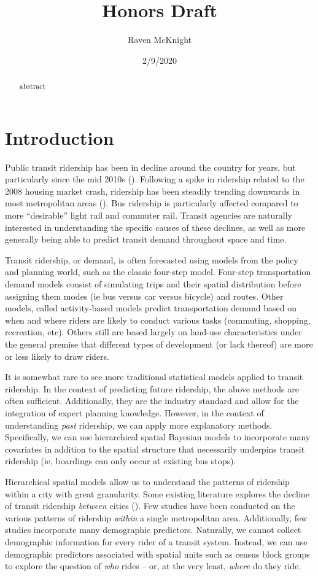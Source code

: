 \documentclass[]{article}
\title{Honors Draft}
\author{Raven McKnight}
\date{2/9/2020}
\begin{document}
\maketitle
\begin{abstract}
abstract
\end{abstract}

\section{Introduction}\label{introduction}

Public transit ridership has been in decline around the country for
years, but particularly since the mid 2010s (). Following a spike in
ridership related to the 2008 housing market crash, ridership has been
steadily trending downwards in most metropolitan areas (). Bus ridership
is particularly affected compared to more ``desirable'' light rail and
commuter rail. Transit agencies are naturally interested in
understanding the specific causes of these declines, as well as more
generally being able to predict transit demand throughout space and
time.

Transit ridership, or demand, is often forecasted using models from the
policy and planning world, such as the classic four-step model.
Four-step transportation demand models consist of simulating trips and
their spatial distribution before assigning them modes (ie bus versus
car versus bicycle) and routes. Other models, called activity-based
models predict transportation demand based on when and where riders are
likely to conduct various tasks (commuting, shopping, recreation, etc).
Others still are based largely on land-use characteristics under the
general premise that different types of development (or lack thereof)
are more or less likely to draw riders.

It is somewhat rare to see more traditional statistical models applied
to transit ridership. In the context of predicting future ridership, the
above methods are often sufficient. Additionally, they are the industry
standard and allow for the integration of expert planning knowledge.
However, in the context of understanding \emph{past} ridership, we can
apply more explanatory methods. Specifically, we can use hierarchical
spatial Bayesian models to incorporate many covariates in addition to
the spatial structure that necessarily underpins transit ridership (ie,
boardings can only occur at existing bus stops).

Hierarchical spatial models allow us to understand the patterns of
ridership within a city with great granularity. Some existing literature
explores the decline of transit ridership \emph{between} cities (). Few
studies have been conducted on the various patterns of ridership
\emph{within} a single metropolitan area. Additionally, few studies
incorporate many demographic predictors. Naturally, we cannot collect
demographic information for every rider of a transit system. Instead, we
can use demographic predictors associated with spatial units such as
census block groups to explore the question of \emph{who} rides -- or,
at the very least, \emph{where} do they ride.
\end{document}
